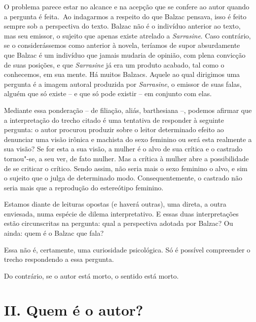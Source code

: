 O problema parece estar no alcance e na acepção que se confere ao autor
quando a pergunta é feita.~Ao indagarmos a respeito do que Balzac
pensava, isso é feito sempre sob a perspectiva do texto. Balzac não é o
indivíduo anterior ao texto, mas seu emissor, o sujeito que apenas
existe atrelado a \emph{Sarrasine}. Caso contrário, se o considerássemos como
anterior à novela, teríamos de supor absurdamente que Balzac é um
indivíduo que jamais mudaria de opinião, com plena convicção de suas
posições, e que \emph{Sarrasine} já era um produto acabado, tal como o
conhecemos, em sua mente. Há muitos Balzacs. Aquele ao qual dirigimos
uma pergunta é a imagem autoral produzida por \emph{Sarrasine}, o emissor de
suas falas, alguém que só existe -- e que só pode existir -- em conjunto
com elas.

Mediante essa ponderação -- de filiação, aliás, barthesiana --, podemos
afirmar que a interpretação do trecho citado é uma tentativa de
responder à seguinte pergunta: o autor procurou produzir sobre o leitor
determinado efeito ao denunciar uma visão irônica e machista do sexo
feminino ou será esta realmente a sua visão? Se for esta a sua visão, a
mulher é o alvo de sua crítica e o castrado tornou"-se, a seu ver, de
fato mulher. Mas a crítica à mulher abre a possibilidade de se criticar
o crítico. Sendo assim, não seria mais o sexo feminino o alvo, e sim o
sujeito que o julga de determinado modo. Consequentemente, o castrado
não seria mais que a reprodução do estereótipo feminino.

Estamos diante de leituras opostas (e haverá outras), uma direta, a
outra enviesada, numa espécie de dilema interpretativo. E essas duas
interpretações estão circunscritas na pergunta: qual a perspectiva
adotada por Balzac? Ou ainda: quem é o Balzac que fala?

Essa não é, certamente, uma curiosidade psicológica. Só é possível
compreender o trecho respondendo a essa pergunta.

Do contrário, se o autor está morto, o sentido está morto.

\section*{II. Quem é o autor?}

